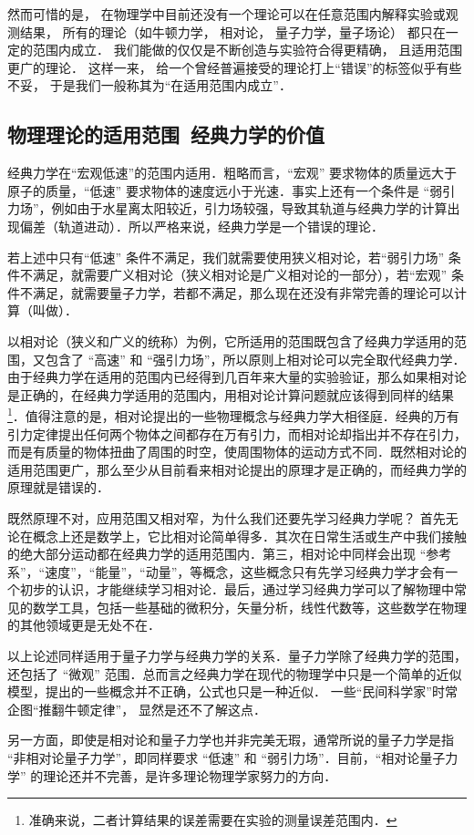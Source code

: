 然而可惜的是， 在物理学中目前还没有一个理论可以在任意范围内解释实验或观测结果， 所有的理论（如牛顿力学， 相对论， 量子力学，量子场论） 都只在一定的范围内成立． 我们能做的仅仅是不断创造与实验符合得更精确， 且适用范围更广的理论． 这样一来， 给一个曾经普遍接受的理论打上“错误”的标签似乎有些不妥， 于是我们一般称其为“在适用范围内成立”．


\subsection{物理理论的适用范围\ 经典力学的价值}

经典力学在“宏观低速”的范围内适用．粗略而言，“宏观” 要求物体的质量远大于原子的质量，“低速” 要求物体的速度远小于光速．事实上还有一个条件是 “弱引力场”，例如由于水星离太阳较近，引力场较强，导致其轨道与经典力学的计算出现偏差（轨道进动）．所以严格来说，经典力学是一个错误的理论．

若上述中只有“低速” 条件不满足，我们就需要使用狭义相对论，若“弱引力场” 条件不满足，就需要广义相对论（狭义相对论是广义相对论的一部分），若“宏观” 条件不满足，就需要量子力学，若都不满足，那么现在还没有非常完善的理论可以计算（叫做）．

以相对论（狭义和广义的统称）为例，它所适用的范围既包含了经典力学适用的范围，又包含了 “高速” 和 “强引力场”，所以原则上相对论可以完全取代经典力学．由于经典力学在适用的范围内已经得到几百年来大量的实验验证，那么如果相对论是正确的，在经典力学适用的范围内，用相对论计算问题就应该得到同样的结果\footnote{准确来说，二者计算结果的误差需要在实验的测量误差范围内．}．值得注意的是，相对论提出的一些物理概念与经典力学大相径庭．经典的万有引力定律提出任何两个物体之间都存在万有引力，而相对论却指出并不存在引力，而是有质量的物体扭曲了周围的时空，使周围物体的运动方式不同．既然相对论的适用范围更广，那么至少从目前看来相对论提出的原理才是正确的，而经典力学的原理就是错误的． 

既然原理不对，应用范围又相对窄，为什么我们还要先学习经典力学呢？ 首先无论在概念上还是数学上，它比相对论简单得多．其次在日常生活或生产中我们接触的绝大部分运动都在经典力学的适用范围内．第三，相对论中同样会出现 “参考系”，“速度”，“能量”，“动量”，等概念，这些概念只有先学习经典力学才会有一个初步的认识，才能继续学习相对论．最后，通过学习经典力学可以了解物理中常见的数学工具，包括一些基础的微积分，矢量分析，线性代数等，这些数学在物理的其他领域更是无处不在．

以上论述同样适用于量子力学与经典力学的关系．量子力学除了经典力学的范围，还包括了 “微观” 范围．总而言之经典力学在现代的物理学中只是一个简单的近似模型，提出的一些概念并不正确，公式也只是一种近似． 一些“民间科学家”时常企图“推翻牛顿定律”， 显然是还不了解这点．

另一方面，即使是相对论和量子力学也并非完美无瑕，通常所说的量子力学是指 “非相对论量子力学”，即同样要求 “低速” 和 “弱引力场”．目前，“相对论量子力学” 的理论还并不完善，是许多理论物理学家努力的方向．




